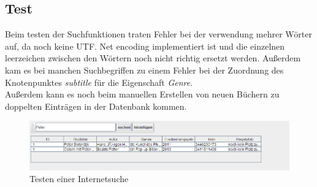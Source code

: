\newpage

\subsection{Test}

Beim testen der Suchfunktionen traten Fehler bei der verwendung mehrer Wörter auf, da noch keine UTF. Net encoding implementiert ist und die einzelnen leerzeichen zwischen den Wörtern noch nicht richtig ersetzt werden. Außerdem kam es bei manchen Suchbegriffen zu einem Fehler bei der Zuordnung des Knotenpunktes \textit{subtitle} für die Eigenschaft \textit{Genre}.\\
Außerdem kann es noch beim manuellen Erstellen von neuen Büchern zu doppelten Einträgen in der Datenbank kommen.\\

\begin{figure}[h]
\begin{center}
\includegraphics[width=15cm]{img/test.png}
\caption{Testen einer Internetsuche}
\label{test}
\end{center}
\end{figure}
